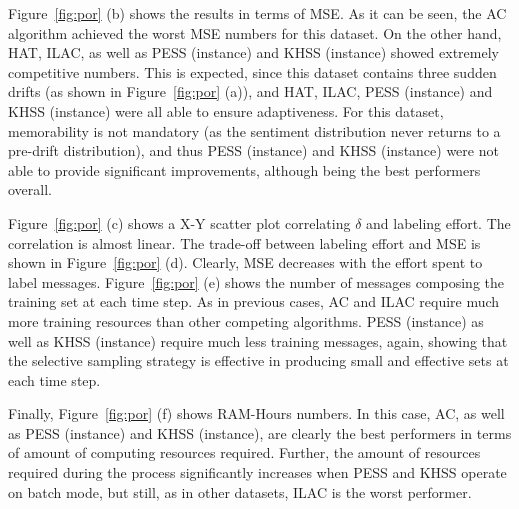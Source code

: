 \documentclass{sig-alternate}
\begin{document}
Figure~\ref{fig:por} (b) shows the results in terms of MSE.%
As it can be seen, the AC algorithm achieved the worst MSE numbers for this dataset. On the other hand, HAT, ILAC, as well as PESS (instance) and KHSS (instance) showed extremely competitive numbers. This is expected, since this dataset contains three sudden drifts (as shown in Figure~\ref{fig:por} (a)), and HAT, ILAC, PESS (instance) and KHSS (instance) were all able to ensure adaptiveness.
For this dataset, memorability is not mandatory (as the sentiment distribution never returns to a pre-drift
distribution), and thus PESS (instance) and KHSS (instance) were not able to provide significant improvements, although being the best performers overall.

Figure~\ref{fig:por} (c) shows a X-Y scatter plot correlating $\delta$ and labeling effort. The correlation is almost linear. The trade-off between labeling effort and MSE is shown in Figure~\ref{fig:por} (d). Clearly, MSE decreases with the effort spent to label messages.
Figure~\ref{fig:por} (e) shows the number of messages composing the training set at each time step.
As in previous cases, AC and ILAC require much more training resources than other competing algorithms. PESS (instance) as well as KHSS (instance) require much less training messages, again, showing that the selective sampling strategy is effective in producing small and effective sets at each time step.

Finally, Figure~\ref{fig:por} (f)
shows RAM-Hours numbers. In this case, AC, as well as PESS (instance) and KHSS (instance), are clearly the best performers in terms of amount of computing resources required. Further, the amount of resources required during the process significantly increases when PESS and KHSS operate on batch mode, but still, as in other datasets, ILAC is the worst performer.
\end{document}
